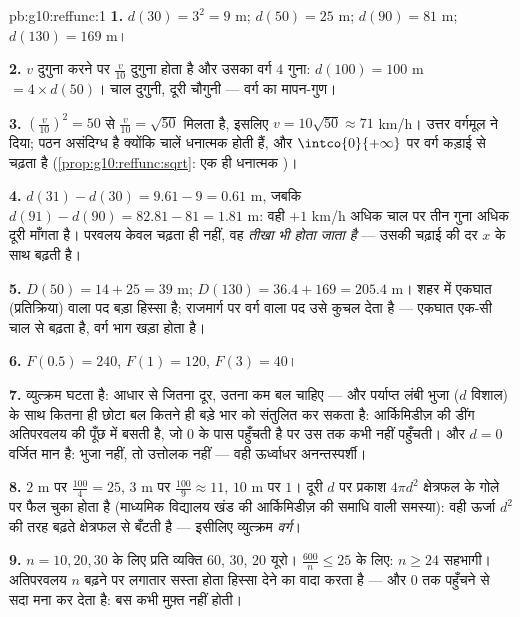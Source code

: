 \begin{solution}{pb:g10:reffunc:1}
\textbf{1.} $d(30) = 3^2 = 9$ m; $d(50) = 25$ m; $d(90) =
81$ m; $d(130) = 169$ m।

\textbf{2.} $v$ दुगुना करने पर $\frac v{10}$ दुगुना होता है और उसका वर्ग $4$
गुना: $d(100) = 100$ m $= 4 \times d(50)$। चाल दुगुनी, दूरी चौगुनी --- वर्ग  का मापन-गुण।

\textbf{3.} $\left(\frac{v}{10}\right)^2 = 50$ से $\frac{v}{10} = \sqrt{50}$ मिलता है, इसलिए $v = 10\sqrt{50} \approx 71$ km/h। उत्तर वर्गमूल ने
दिया; पठन असंदिग्ध है क्योंकि चालें धनात्मक होती हैं, और $\intco{0}{+\infty}$ पर वर्ग 
कड़ाई से चढ़ता है (\cref{prop:g10:reffunc:sqrt}: एक ही धनात्मक )।

\textbf{4.} $d(31) - d(30) = 9.61 - 9 = 0.61$ m, जबकि $d(91) - d(90) = 82.81 - 81 = 1.81$ m: वही $+1$ km/h अधिक चाल पर तीन गुना
अधिक दूरी माँगता है। परवलय केवल चढ़ता ही नहीं, वह \emph{तीखा भी होता जाता
है} --- उसकी चढ़ाई की दर $x$ के साथ बढ़ती है।

\textbf{5.} $D(50) = 14 + 25 = 39$ m; $D(130) = 36.4 + 169 =
205.4$ m। शहर में एकघात (प्रतिक्रिया) वाला पद बड़ा
हिस्सा है; राजमार्ग पर वर्ग वाला पद उसे कुचल देता है --- एकघात एक-सी चाल से
बढ़ता है, वर्ग भाग खड़ा होता है।

\textbf{6.} $F(0.5) = 240$, $F(1) = 120$, $F(3) = 40$।

\textbf{7.} व्युत्क्रम  घटता है: आधार से जितना दूर, उतना कम बल चाहिए ---
और पर्याप्त लंबी भुजा ($d$ विशाल) के साथ कितना ही छोटा बल कितने ही बड़े
भार को संतुलित कर सकता है: आर्किमिडीज़ की डींग अतिपरवलय की पूँछ में बसती है,
जो $0$ के पास पहुँचती है पर उस तक कभी नहीं पहुँचती। और $d = 0$ वर्जित मान
है: भुजा नहीं, तो उत्तोलक नहीं --- वही ऊर्ध्वाधर अनन्तस्पर्शी।

\textbf{8.} $2$ m पर $\frac{100}{4} = 25$, $3$ m पर $\frac{100}{9} \approx 11$, $10$ m पर $1$। दूरी $d$
पर प्रकाश $4\pi d^2$ क्षेत्रफल के गोले पर फैल चुका होता है (माध्यमिक विद्यालय
खंड की आर्किमिडीज़ की समाधि वाली समस्या): वही ऊर्जा $d^2$ की तरह बढ़ते
क्षेत्रफल से बँटती है --- इसीलिए व्युत्क्रम \emph{वर्ग}।

\textbf{9.} $n = 10, 20,
30$ के लिए प्रति व्यक्ति $60$, $30$, $20$ यूरो। $\frac{600}{n} \leq 25$ के
लिए: $n \geq 24$ सहभागी। अतिपरवलय $n$ बढ़ने पर लगातार सस्ता होता हिस्सा देने का
वादा करता है --- और $0$ तक पहुँचने से सदा मना कर देता है: बस कभी मुफ़्त
नहीं होती।


\end{solution}
